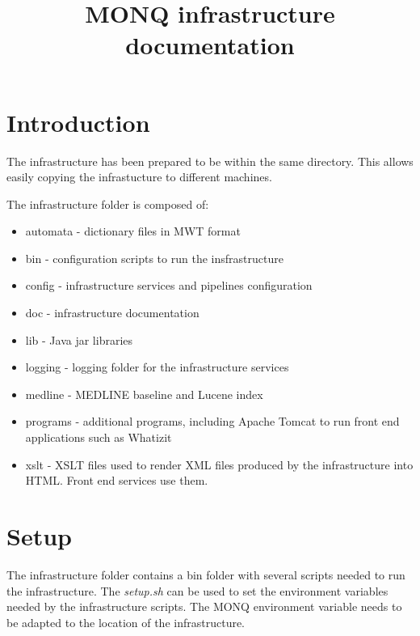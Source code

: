 \documentclass{report}
\title{MONQ infrastructure documentation}
\author{}
\begin{document}
\maketitle

\section{Introduction}


The infrastructure has been prepared to be within the same directory.
This allows easily copying the infrastucture to different machines.

The infrastructure folder is composed of:

\begin{itemize}

\item{automata} - dictionary files in MWT format

\item{bin} - configuration scripts to run the insfrastructure

\item{config} - infrastructure services and pipelines configuration

\item{doc} - infrastructure documentation

\item{lib} - Java jar libraries

\item{logging} - logging folder for the infrastructure services

\item{medline} - MEDLINE baseline and Lucene index

\item{programs} - additional programs, including Apache Tomcat to run front end applications such as Whatizit

\item{xslt} - XSLT files used to render XML files produced by the infrastructure into HTML. Front end services use them.

\end{itemize}

\section{Setup}

The infrastructure folder contains a bin folder with several scripts needed to run the infrastructure.
The \textit{setup.sh} can be used to set the environment variables needed by the infrastructure scripts.
The MONQ environment variable needs to be adapted to the location of the infrastructure.
\end{document}
